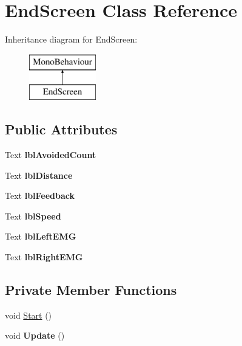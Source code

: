 \hypertarget{class_end_screen}{}\section{End\+Screen Class Reference}
\label{class_end_screen}
Inheritance diagram for End\+Screen\+:\begin{figure}[H]
\begin{center}
\leavevmode
\includegraphics[height=2.000000cm]{class_end_screen}
\end{center}
\end{figure}
\subsection*{Public Attributes}
\begin{DoxyCompactItemize}
\item 
\mbox{\label{class_end_screen_aacf83d3650bbcfdda1a8ecff8d0936db}} 
Text {\bfseries lbl\+Avoided\+Count}
\item 
\mbox{\label{class_end_screen_a47d7d079646fce7b71049cccb1289e3b}} 
Text {\bfseries lbl\+Distance}
\item 
\mbox{\label{class_end_screen_a6c11a56bed5cdf233b7a2a073455c8f3}} 
Text {\bfseries lbl\+Feedback}
\item 
\mbox{\label{class_end_screen_a3a625bbadeb1f616b4ed043337455c53}} 
Text {\bfseries lbl\+Speed}
\item 
\mbox{\label{class_end_screen_a861db153b2c09833d570a6ed65ad0e91}} 
Text {\bfseries lbl\+Left\+E\+MG}
\item 
\mbox{\label{class_end_screen_aee90cc0f644c5358ccb21a0914ae1006}} 
Text {\bfseries lbl\+Right\+E\+MG}
\end{DoxyCompactItemize}
\subsection*{Private Member Functions}
\begin{DoxyCompactItemize}
\item 
void \hyperlink{class_end_screen_a94abdfce9b0c1b1fd7775b62cee4fa47}{Start} ()
\item 
\mbox{\label{class_end_screen_aa9052d4c8d3d9d64543c584342c535b1}} 
void {\bfseries Update} ()
\end{DoxyCompactItemize}


